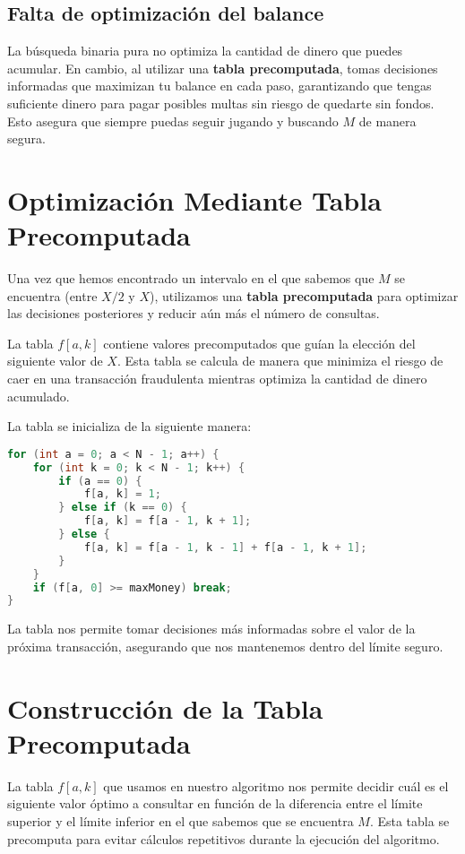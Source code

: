 \documentclass{article}
\begin{document}
\subsection{Falta de optimización del balance}
La búsqueda binaria pura no optimiza la cantidad de dinero que puedes acumular. En cambio, al utilizar una \textbf{tabla precomputada}, tomas decisiones informadas que maximizan tu balance en cada paso, garantizando que tengas suficiente dinero para pagar posibles multas sin riesgo de quedarte sin fondos. Esto asegura que siempre puedas seguir jugando y buscando \(M\) de manera segura.



\section{Optimización Mediante Tabla Precomputada}

Una vez que hemos encontrado un intervalo en el que sabemos que $M$ se encuentra (entre $X/2$ y $X$), utilizamos una \textbf{tabla precomputada} para optimizar las decisiones posteriores y reducir aún más el número de consultas.

La tabla $f[a, k]$ contiene valores precomputados que guían la elección del siguiente valor de $X$. Esta tabla se calcula de manera que minimiza el riesgo de caer en una transacción fraudulenta mientras optimiza la cantidad de dinero acumulado.

La tabla se inicializa de la siguiente manera:

\begin{lstlisting}[language=C]
for (int a = 0; a < N - 1; a++) {
    for (int k = 0; k < N - 1; k++) {
        if (a == 0) {
            f[a, k] = 1;
        } else if (k == 0) {
            f[a, k] = f[a - 1, k + 1];
        } else {
            f[a, k] = f[a - 1, k - 1] + f[a - 1, k + 1];
        }
    }
    if (f[a, 0] >= maxMoney) break;
}
\end{lstlisting}

La tabla nos permite tomar decisiones más informadas sobre el valor de la próxima transacción, asegurando que nos mantenemos dentro del límite seguro.


\section{Construcción de la Tabla Precomputada}
La tabla $f[a, k]$ que usamos en nuestro algoritmo nos permite decidir cuál es el siguiente valor óptimo a consultar en función de la diferencia entre el límite superior y el límite inferior en el que sabemos que se encuentra $M$. Esta tabla se precomputa para evitar cálculos repetitivos durante la ejecución del algoritmo.
\end{document}
